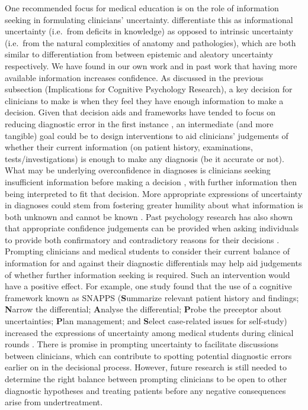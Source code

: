\documentclass[a4paper, nobind]{templates/ociamthesis}
\begin{document}
One recommended focus for medical education is on the role of information seeking in formulating clinicians' uncertainty. \textcite{wray_diagnosis_2015} differentiate this as informational uncertainty (i.e.~from deficits in knowledge) as opposed to intrinsic uncertainty (i.e.~from the natural complexities of anatomy and pathologies), which are both similar to differentiation from \textcite{ülkümen2016} between epistemic and aleatory uncertainty respectively. We have found in our own work and in past work \autocite{gruppen_information_1991,ko_divergent_2022} that having more available information increases confidence. As discussed in the previous subsection (Implications for Cognitive Psychology Research), a key decision for clinicians to make is when they feel they have enough information to make a decision. Given that decision aids and frameworks have tended to focus on reducing diagnostic error in the first instance \autocite{dave_interventions_2022}, an intermediate (and more tangible) goal could be to design interventions to aid clinicians' judgements of whether their current information (on patient history, examinations, tests/investigations) is enough to make any diagnosis (be it accurate or not). What may be underlying overconfidence in diagnoses is clinicians seeking insufficient information before making a decision \autocite{meyer_calibrating_2017}, with further information then being interpreted to fit that decision. More appropriate expressions of uncertainty in diagnoses could stem from fostering greater humility \autocite{fischer_intellectual_2024} about what information is both unknown and cannot be known \autocite{gehlbach_illusion_2024}. Past psychology research has also shown that appropriate confidence judgements can be provided when asking individuals to provide both confirmatory and contradictory reasons for their decisions \autocite{koriat_reasons_1980}. Prompting clinicians and medical students to consider their current balance of information for and against their diagnostic differentials may help aid judgements of whether further information seeking is required. Such an intervention would have a positive effect. For example, one study found that the use of a cognitive framework known as SNAPPS (\textbf{S}ummarize relevant patient history and findings; \textbf{N}arrow the differential; \textbf{A}nalyse the differential; \textbf{P}robe the preceptor about uncertainties; \textbf{P}lan management; and \textbf{S}elect case-related issues for self-study) increased the expressions of uncertainty among medical students during clinical rounds \autocite{wolpaw_student_2012}. There is promise in prompting uncertainty to facilitate discussions between clinicians, which can contribute to spotting potential diagnostic errors earlier on in the decisional process. However, future research is still needed to determine the right balance between prompting clinicians to be open to other diagnostic hypotheses and treating patients before any negative consequences arise from undertreatment.
\end{document}
